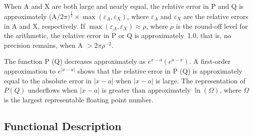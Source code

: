 \documentclass[twoside]{MATH77}
\begin{document}
When A and X are both large and nearly equal, the relative error in P and Q
is approximately (A$/2\pi )^{\frac 12} \times \max (\varepsilon
_A,\varepsilon _X)$, where $\varepsilon _A$ and $\varepsilon _X$ are the
relative errors in A and X, respectively. If $\max (\varepsilon
_A,\varepsilon _X) \approx \rho $, where $\rho $ is the round-off level for
the arithmetic, the relative error in P or Q is approximately~1.0, that is,
no precision remains, when A $> 2\pi \rho ^{-2}.$

The function P (Q) decreases approximately as $e^{x-a} (e^{a-x})$. A
first-order approximation to $e^{|x-a|}$ shows that the relative error in P
(Q) is approximately equal to the absolute error in $|x-a|$ when $|x-a|$ is
large. The representation of $P(Q)$ underflows when $|x-a|$ is greater
than approximately $\ln (\Omega )$, where $\Omega $ is the largest
representable floating point number.

\subsection{Functional Description}
\end{document}
